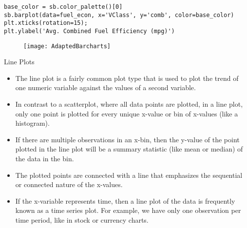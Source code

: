 \documentclass[12pt]{beamer}
\begin{document}
    \begin{frame}[fragile]{}
    	\fontsize{10}{1}
    	\begin{verbatim}
base_color = sb.color_palette()[0]
sb.barplot(data=fuel_econ, x='VClass', y='comb', color=base_color)
plt.xticks(rotation=15);
plt.ylabel('Avg. Combined Fuel Efficiency (mpg)')
    	\end{verbatim}
    \begin{figure}
    	\centering
    	\texttt{[image: AdaptedBarcharts]}
    \end{figure}
    \end{frame}
    \begin{frame}{Line Plots}
    	\begin{itemize}
    		\item The line plot is a fairly common plot type that is used to plot the trend of one numeric variable against the values of a second variable.
    		\item In contrast to a scatterplot, where all data points are plotted, in a line plot, only one point is plotted for every unique x-value or bin of x-values (like a histogram).
    		\item If there are multiple observations in an x-bin, then the y-value of the point plotted in the line plot will be a summary statistic (like mean or median) of the data in the bin. 
    		\item The plotted points are connected with a line that emphasizes the sequential or connected nature of the x-values.
    		\item If the x-variable represents time, then a line plot of the data is frequently known as a time series plot. For example, we have only one observation per time period, like in stock or currency charts.
    	\end{itemize}
    \end{frame}
\end{document}
